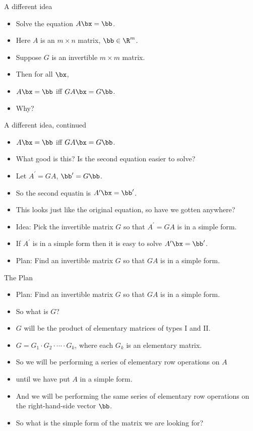 \documentclass{beamer}
\begin{document}
\begin{frame}{A different idea}

\begin{itemize}
\item Solve the equation $A\bx=\bb$.
\item Here $A$ is an $m\times n$ matrix, $\bb\in\R^{m}$.
\item Suppose $G$ is an invertible $m\times m$ matrix.
\item Then for all $\bx$,
\item $A\bx=\bb$ iff $GA\bx = G\bb$.
\item Why?
\end{itemize}
\end{frame}

\begin{frame}{A different idea, continued}

\begin{itemize}
\item $A\bx=\bb$ iff $GA\bx = G\bb$.
\item What good is this? Is the second equation easier to solve?
\item Let $A^{\prime} = GA$, $\bb^{\prime} = G\bb$.
\item So the second equatin is $A^{\prime}\bx=\bb^{\prime}$.
\item This looks just like the original equation, so have we gotten anywhere?
\item Idea: Pick the invertible matrix $G$ so that $A^{\prime}=GA$ is in a simple form.
\item If $A^{\prime}$ is in a simple form then it is easy to solve $A^{\prime}\bx=\bb^{\prime}$.
\item Plan: Find an invertible matrix $G$ so that $GA$ is in a simple form.
\end{itemize}
\end{frame}

\begin{frame}{The Plan}

\begin{itemize}
\item Plan: Find an invertible matrix $G$ so that $GA$ is in a simple form.
\item So what is $G$?
\item $G$ will be the product of elementary matrices of types I and II.
\item $G=G_1\cdot G_2 \cdot \cdots \cdot G_k$, where each $G_k$ is an elementary matrix.
\item So we will be performing a series of elementary row operations on $A$
\item until we have put $A$ in a simple form.
\item And we will be performing the same series of elementary row operations
on the right-hand-side vector $\bb$.
\item So what is the simple form of the matrix we are looking for?
\end{itemize}
\end{frame}
\end{document}
